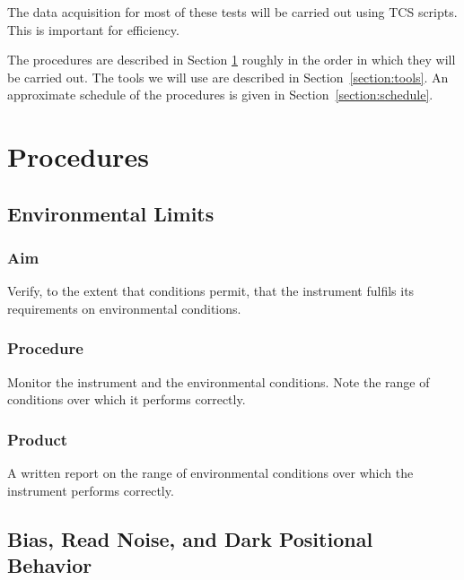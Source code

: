 \documentclass{article}
\begin{document}
The data acquisition for most of these tests will be carried out using TCS scripts. This is important for efficiency.

The procedures are described in Section \ref{section:procedures} roughly in the order in which they will be carried out. The tools we will use are described in Section~\ref{section:tools}. An approximate schedule of the procedures is given in Section~\ref{section:schedule}.

\section{Procedures}
\label{section:procedures}


\subsection{Environmental Limits}

\subsubsection{Aim}

Verify, to the extent that conditions permit, that the instrument fulfils its requirements on environmental conditions.

\subsubsection{Procedure}

Monitor the instrument and the environmental conditions. Note the range of conditions over which it performs correctly.

\subsubsection{Product}

A written report on the range of environmental conditions over which the instrument performs correctly.


\subsection{Bias, Read Noise, and Dark Positional Behavior}
\end{document}
